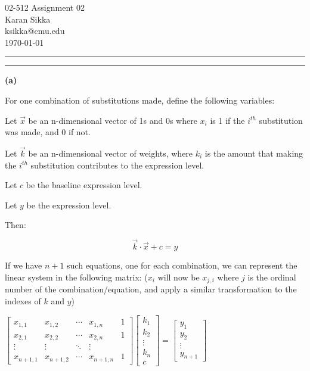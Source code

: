 \documentclass[11pt,letterpaper]{article}
\makeatletter
\newcommand{\question}[1] {\vspace{.25in} \hrule\vspace{0.5em}
\noindent{\bf #1} \vspace{0.5em}
\hrule \vspace{.10in}}
\renewcommand{\part}[1] {\vspace{.10in} {\bf (#1)}}
\newcommand{\myname}{Karan Sikka}
\newcommand{\myandrew}{ksikka@cmu.edu}
\newcommand{\myhwnum}{02}
\makeatother
\begin{document}
\medskip

\thispagestyle{plain}
\begin{center}                  %
{\Large 02-512 Assignment \myhwnum} \\
\myname \\
\myandrew \\
\today
\end{center}

\question{1}

\part{a}

For one combination of substitutions made, define the following variables:

Let $\vec{x}$ be an n-dimensional vector of 1s and 0s where $x_i$ is 1
if the $i^{th}$ substitution was made, and 0 if not.

Let $\vec{k}$ be an n-dimensional vector of weights, where $k_i$ is the amount
that making the $i^{th}$ substitution contributes to the expression level.

Let $c$ be the baseline expression level.

Let $y$ be the expression level.

Then:

$$\vec{k} \cdot \vec{x} + c = y$$

If we have $n+1$ such equations, one for each combination, we can represent the linear
system in the following matrix: ($x_i$ will now be $x_{j,i}$ where $j$ is the ordinal number of the combination/equation, and apply a similar transformation to the indexes of $k$ and $y$)

$
 \begin{bmatrix}
  x_{1,1} & x_{1,2} & \cdots & x_{1,n} & 1\\
  x_{2,1} & x_{2,2} & \cdots & x_{2,n} & 1\\
  \vdots  & \vdots  & \ddots & \vdots  \\
  x_{n+1,1} & x_{n+1,2} & \cdots & x_{n+1,n} & 1
 \end{bmatrix}
 \begin{bmatrix}
  k_{1} \\
  k_{2} \\
  \vdots  \\
  k_{n} \\
  c
 \end{bmatrix}
 =
 \begin{bmatrix}
  y_{1} \\
  y_{2} \\
  \vdots  \\
  y_{n+1}
 \end{bmatrix}
$
\end{document}
